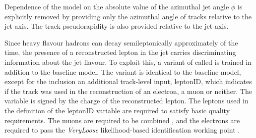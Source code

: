 Dependence of the model on the absolute value of the azimuthal jet angle $\phi$ is explicitly removed by providing only the azimuthal angle of tracks relative to the jet axis. The track pseudorapidity is also provided relative to the jet axis.

Since heavy flavour hadrons can decay semileptonically approximately  of the time, the presence of a reconstructed lepton in the jet carries discriminating information about the jet flavour. 
To exploit this, a variant of \GNN called \GNNLep is trained in addition to the baseline model.
The \GNNLep variant is identical to the baseline model, except for the inclusion an additional track-level input, leptonID, which indicates if the track was used in the reconstruction of an electron, a muon or neither. 
The variable is signed by the charge of the reconstructed lepton.
The leptons used in the definition of the leptonID variable are required to satisfy basic quality requirements.
The muons are required to be combined \cite{ATL-PHYS-PUB-2015-037}, and the electrons are required to pass the \textit{VeryLoose} likelihood-based identification working point \cite{PERF-2017-01}.

